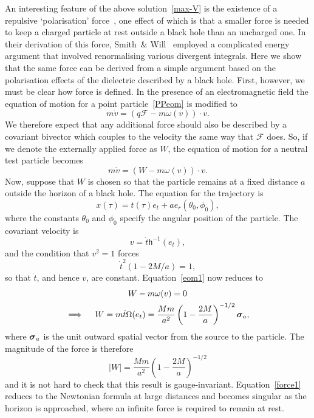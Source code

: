\documentclass[a4paper]{article}
\numberwithin{equation}{section}
\newcommand{\dt}{\! \cdot \!}
\newcommand{\sig}{\mbox{\boldmath $\sigma$}}
\newcommand{\om}{\omega}
\newcommand{\Om}{\Omega}
\newcommand{\tdot}{\dot{t}}
\newcommand{\vdot}{\dot{v}}
\newcommand{\clf}{{\mathcal{F}}}
\newcommand{\lih}{\mathsf{h}}
\newcommand{\hu}{\lih}
\begin{document}
An interesting feature of the above solution~\eqref{max-V} is the
existence of a repulsive `polarisation' force~\cite{smi80}, one effect
of which is that a smaller force is needed to keep a charged particle
at rest outside a black hole than an uncharged one.  In their
derivation of this force, Smith~\& Will~\cite{smi80} employed a
complicated energy argument that involved renormalising various
divergent integrals.  Here we show that the same force can be derived
from a simple argument based on the polarisation effects of the
dielectric described by a black hole.  First, however, we must be
clear how force is defined.  In the presence of an electromagnetic
field the equation of motion for a point particle~\eqref{PPeom} is
modified to
%
\begin{equation}
m \vdot = (q \clf - m \om(v)) \dt v.
\label{force2}
\end{equation}
%
We therefore expect that any additional force should also be described
by a covariant bivector which couples to the velocity the same way
that $\clf$ does.  So, if we denote the externally applied force as
$W$, the equation of motion for a neutral test particle becomes
%
\begin{equation}
m\vdot = (W - m \om(v)) \dt v.
\label{eom1} 
\end{equation} 
%
Now, suppose that $W$ is chosen so that the particle remains at a
fixed distance $a$ outside the horizon of a black hole.  The equation
for the trajectory is
%
\begin{equation}
x (\tau) = t(\tau) e_t + a e_r(\theta_0, \phi_0),
\end{equation} 
%
where the constants $\theta_0$ and $\phi_0$ specify the angular
position of the particle.  The covariant velocity is
%
\begin{equation}
v = \tdot \hu^{-1}(e_t),
\end{equation}
%
and the condition that $v^2=1$ forces
%
\begin{equation}
\tdot^2 (1- 2M/a) = 1,
\end{equation} 
%
so that $\tdot$, and hence $v$, are constant.  Equation~\eqref{eom1} now
reduces to
%
\begin{gather}
W - m\om(v) = 0 \\
\implies \quad W = m \tdot \Om(e_t) = \frac{Mm}{a^2}
\left(1-\frac{2M}{a} \right)^{-1/2} \sig_a,
\end{gather}
%
where $\sig_a$ is the unit outward spatial vector from the source to
the particle.  The magnitude of the force is therefore 
%
\begin{equation}
|W| =  \frac{Mm}{a^2} \left(1-\frac{2M}{a} \right)^{-1/2}
\label{force1}
\end{equation} 
%
and it is not hard to check that this result is gauge-invariant.
Equation~\eqref{force1} reduces to the Newtonian formula at large
distances and becomes singular as the horizon is approached, where an
infinite force is required to remain at rest.
\end{document}
